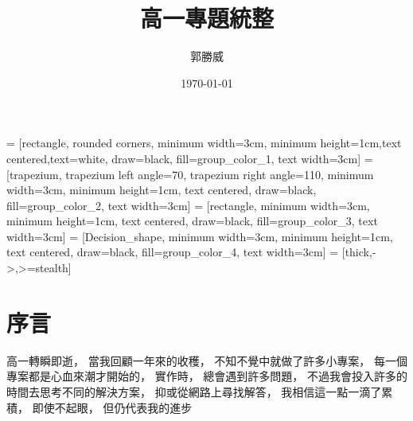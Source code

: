 \documentclass[12pt,oneside]{ctexart}
\title{ 高一專題統整 }
\author{ 郭勝威 }
\date{ \today }
\begin{document}







 = [rectangle, rounded corners, minimum width=3cm, minimum height=1cm,text centered,text=white, draw=black, fill=group_color_1, text width=3cm]
 = [trapezium, trapezium left angle=70, trapezium right angle=110, minimum width=3cm, minimum height=1cm, text centered, draw=black, fill=group_color_2, text width=3cm]
 = [rectangle, minimum width=3cm, minimum height=1cm, text centered, draw=black, fill=group_color_3, text width=3cm]
 = [Decision_shape, minimum width=3cm, minimum height=1cm, text centered, draw=black, fill=group_color_4, text width=3cm]
 = [thick,->,>=stealth]





\pagestyle{empty}
\maketitle

\thispagestyle{empty}


\clearpage
\tableofcontents

\pagestyle{plain}
\setcounter{page}{0}

\clearpage
\section{ 序言 }

高一轉瞬即逝， 
當我回顧一年來的收穫，
不知不覺中就做了許多小專案，
每一個專案都是心血來潮才開始的，
實作時，
總會遇到許多問題，
不過我會投入許多的時間去思考不同的解決方案，
抑或從網路上尋找解答，
我相信這一點一滴了累積，
即使不起眼，
但仍代表我的進步
\end{document}
